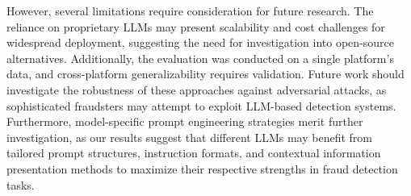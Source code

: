 \documentclass[sigconf]{acmart}
\begin{document}
However, several limitations require consideration for future research. The reliance on proprietary LLMs may present scalability and cost challenges for widespread deployment, suggesting the need for investigation into open-source alternatives. Additionally, the evaluation was conducted on a single platform's data, and cross-platform generalizability requires validation. Future work should investigate the robustness of these approaches against adversarial attacks, as sophisticated fraudsters may attempt to exploit LLM-based detection systems. Furthermore, model-specific prompt engineering strategies merit further investigation, as our results suggest that different LLMs may benefit from tailored prompt structures, instruction formats, and contextual information presentation methods to maximize their respective strengths in fraud detection tasks.





 
\end{document}
